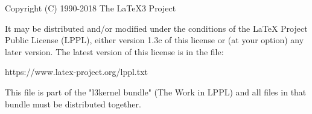 \iffalse meta-comment

File l3.ins Copyright (C) 2011,2012,2014-2018 The LaTeX3 Project

It may be distributed and/or modified under the conditions of the
LaTeX Project Public License (LPPL), either version 1.3c of this
license or (at your option) any later version.  The latest version
of this license is in the file

   https://www.latex-project.org/lppl.txt

This file is part of the "l3kernel bundle" (The Work in LPPL)
and all files in that bundle must be distributed together.

-----------------------------------------------------------------------

The development version of the bundle can be found at

   https://github.com/latex3/latex3

for those people who are interested.

-----------------------------------------------------------------------

Any modification of this file should ensure that the copyright and
license information is placed in the derived files.

\fi

\let\jobname\relax

\askforoverwritefalse

\preamble

Copyright (C) 1990-2018 The LaTeX3 Project

It may be distributed and/or modified under the conditions of
the LaTeX Project Public License (LPPL), either version 1.3c of
this license or (at your option) any later version.  The latest
version of this license is in the file:

   https://www.latex-project.org/lppl.txt

This file is part of the "l3kernel bundle" (The Work in LPPL)
and all files in that bundle must be distributed together.

\endpreamble
\postamble
\endpostamble

\keepsilent


